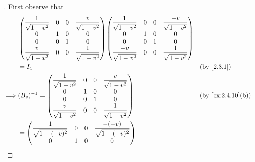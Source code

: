 \begin{proof}[]
  First observe that
  \begin{align*}
             & \begin{pmatrix}
                 \dfrac{1}{\sqrt{1 - v^2}} & 0 & 0 & \dfrac{v}{\sqrt{1 - v^2}} \\
                 0                         & 1 & 0 & 0                         \\
                 0                         & 0 & 1 & 0                         \\
                 \dfrac{v}{\sqrt{1 - v^2}} & 0 & 0 & \dfrac{1}{\sqrt{1 - v^2}}
               \end{pmatrix} \begin{pmatrix}
                               \dfrac{1}{\sqrt{1 - v^2}}  & 0 & 0 & \dfrac{-v}{\sqrt{1 - v^2}} \\
                               0                          & 1 & 0 & 0                          \\
                               0                          & 0 & 1 & 0                          \\
                               \dfrac{-v}{\sqrt{1 - v^2}} & 0 & 0 & \dfrac{1}{\sqrt{1 - v^2}}
                             \end{pmatrix}            \\
             & = I_4                                                                                      &  & \by{2.3.1} \\
    \implies & (B_v)^{-1} = \begin{pmatrix}
                              \dfrac{1}{\sqrt{1 - v^2}} & 0 & 0 & \dfrac{v}{\sqrt{1 - v^2}} \\
                              0                         & 1 & 0 & 0                         \\
                              0                         & 0 & 1 & 0                         \\
                              \dfrac{v}{\sqrt{1 - v^2}} & 0 & 0 & \dfrac{1}{\sqrt{1 - v^2}}
                            \end{pmatrix}         &  & \by{ex:2.4.10}[b]               \\
             & = \begin{pmatrix}
                   \dfrac{1}{\sqrt{1 - (-v)^2}}     & 0 & 0 & \dfrac{-(-v)}{\sqrt{1 - (-v)^2}} \\
                   0                                & 1 & 0 & 0                                \\

\end{pmatrix}
\end{align*}
\end{proof}
